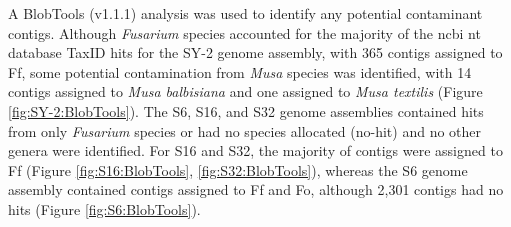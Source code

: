 A BlobTools (v1.1.1) analysis was used to identify any potential contaminant contigs. Although \textit{Fusarium} species accounted for the majority of the \ac{ncbi} nt database TaxID hits for the SY-2 genome assembly, with 365 contigs assigned to \ac{Ff}, some potential contamination from \textit{Musa} species was identified, with 14 contigs assigned to \textit{Musa balbisiana} and one assigned to \textit{Musa textilis} (Figure \ref{fig:SY-2:BlobTools}). The S6, S16, and S32 genome assemblies contained hits from only \textit{Fusarium} species or had no species allocated (no-hit) and no other genera were identified. For S16 and S32, the majority of contigs were assigned to \ac{Ff} (Figure \ref{fig:S16:BlobTools}, \ref{fig:S32:BlobTools}), whereas the  S6 genome assembly contained contigs assigned to \ac{Ff} and \ac{Fo}, although 2,301 contigs had no hits (Figure \ref{fig:S6:BlobTools}).  

